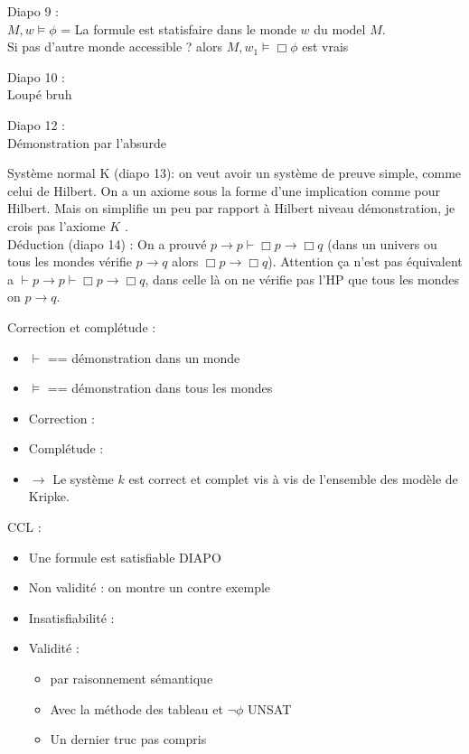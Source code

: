 \documentclass{article}
\theoremstyle{plain}%
\theoremstyle{definition}
\theoremstyle{remark}
\begin{document}
Diapo 9 : \\
$ M, w \models \phi $ = La formule est statisfaire dans le monde $ w $ du model $ M $. \\
Si pas d'autre monde accessible ? alors $ M, w_1 \models \Box \phi  $ est vrais

Diapo 10 : \\
Loupé bruh

Diapo 12 : \\
Démonstration par l'absurde 

Système normal K (diapo 13): on veut avoir un système de preuve simple, comme celui de Hilbert. On a un axiome sous la forme d'une implication comme pour Hilbert. Mais on simplifie un peu par rapport à Hilbert niveau démonstration, je crois pas l'axiome $ K $ . \\
Déduction (diapo 14) : On a prouvé $ p \rightarrow p \vdash \Box p \rightarrow \Box q $ (dans un univers ou tous les mondes vérifie $ p \rightarrow q $ alors $ \Box p \rightarrow \Box q $). Attention ça n'est pas équivalent a $ \vdash p \rightarrow p \vdash \Box p \rightarrow \Box q$, dans celle là on ne vérifie pas l'HP que tous les mondes on $ p \rightarrow q $. 

Correction et complétude : 
\begin{itemize}
    \item $ \vdash  $ == démonstration dans un monde
    \item $ \models  $ == démonstration dans tous les mondes
    \item Correction : 
    \item Complétude :
    \item $\rightarrow$ Le système $ k $ est correct et complet vis à vis de l'ensemble des modèle de Kripke. 
\end{itemize}

CCL : 
\begin{itemize}
    \item Une formule est satisfiable DIAPO
    \item Non validité : on montre un contre exemple
    \item Insatisfiabilité : 
    \item Validité : \begin{itemize}
        \item par raisonnement sémantique
        \item Avec la méthode des tableau et $ \lnot \phi  $ UNSAT
        \item Un dernier truc pas compris
    \end{itemize}
\end{itemize}
\end{document}
